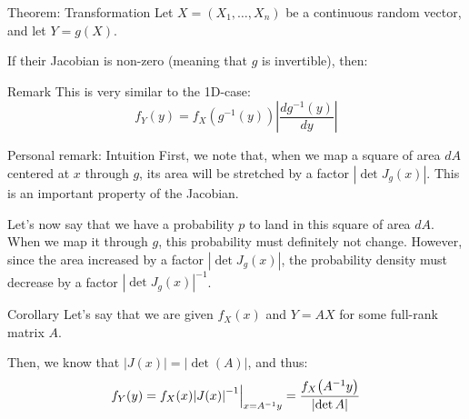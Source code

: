 \documentclass[a4paper]{article}
\begin{document}
\begin{parag}{Theorem: Transformation}
    Let $X = \left(X_1, \ldots, X_n\right)$ be a continuous random vector, and let $Y = g\left(X\right)$.

    If their Jacobian is non-zero (meaning that $g$ is invertible), then: 
    
    \begin{subparag}{Remark}
        This is very similar to the 1D-case:
        \[f_Y\left(y\right) = f_X\left(g^{-1}\left(y\right)\right) \left|\frac{dg^{-1}\left(y\right)}{dy}\right|\]
    \end{subparag}

    \begin{subparag}{Personal remark: Intuition}
        First, we note that, when we map a square of area $dA$ centered at $x$ through $g$, its area will be stretched by a factor $\left|\det J_g\left(x\right)\right|$. This is an important property of the Jacobian.

        Let's now say that we have a probability $p$ to land in this square of area $dA$. When we map it through $g$, this probability must definitely not change. However, since the area increased by a factor $\left|\det J_g\left(x\right)\right|$, the probability density must decrease by a factor $\left|\det J_g\left(x\right)\right|^{-1}$.
    \end{subparag}
\end{parag}

\begin{parag}{Corollary}
    Let's say that we are given $f_X\left(x\right)$ and $Y = AX$ for some full-rank matrix $A$.

    Then, we know that $\left|J\left(x\right)\right| = \left|\det\left(A\right)\right|$, and thus:
    \[f_Y\left(y\right) = f_X\left(x\right) \left|J\left(x\right)\right|^{-1} \eval_{x = A^{-1} y}^{} = \frac{f_X\left(A^{-1} y\right)}{\left|\det A\right|}\]
\end{parag}
\end{document}
